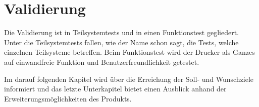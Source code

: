 \section{Validierung}
\label{sec:Validierung}

Die Validierung ist in Teilsystemtests und in einen Funktionstest gegliedert. Unter die Teilsystemtests fallen, wie der Name schon sagt, die Tests, welche einzelnen Teilsysteme betreffen. Beim Funktionstest wird der Drucker als Ganzes auf einwandfreie Funktion und Benutzerfreundlichkeit getestet.

Im darauf folgenden Kapitel wird über die Erreichung der Soll- und Wunschziele informiert und das letzte Unterkapitel bietet einen Ausblick anhand der Erweiterungsmöglichkeiten des Produkts.
